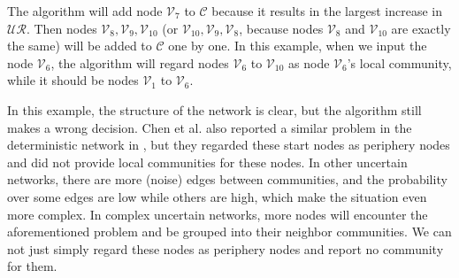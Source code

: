 \documentclass[\main/thesis.tex]{subfiles}
\begin{document}
The algorithm will add node $\mathcal{V}_7$ to $\mathcal{C}$ because it results in the largest increase in $\mathcal{UR}$. Then nodes $\mathcal{V}_8, \mathcal{V}_9, \mathcal{V}_{10}$ (or $\mathcal{V}_{10}, \mathcal{V}_9, \mathcal{V}_{8}$, because nodes $\mathcal{V}_8$ and $\mathcal{V}_{10}$ are exactly the same) will be added to $\mathcal{C}$ one by one. In this example, when we input the node $\mathcal{V}_6$, the algorithm will regard nodes $\mathcal{V}_6$ to $\mathcal{V}_{10}$ as node $\mathcal{V}_6$'s local community, while it should be nodes $\mathcal{V}_1$ to $\mathcal{V}_6$.

In this example, the structure of the network is clear, but the algorithm still makes a wrong decision. Chen et al. also reported a similar problem in the deterministic network in \cite{chen2009local}, but they regarded these start nodes as periphery nodes and did not provide local communities for these nodes. In other uncertain networks, there are more (noise) edges between communities, and the probability over some edges are low while others are high, which make the situation even more complex. In complex uncertain networks, more nodes will encounter the aforementioned problem and be grouped into their neighbor communities. We can not just simply regard these nodes as periphery nodes and report no community for them.
\end{document}
